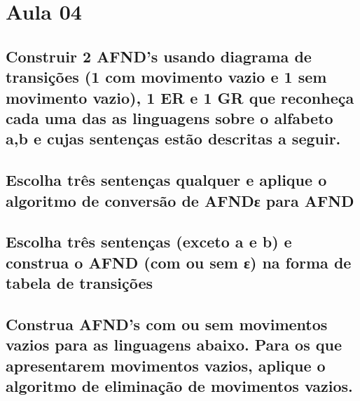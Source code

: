\section{Aula 04}
    \subsection{Construir 2 AFND's usando diagrama de transições (1 com movimento vazio e 1 sem movimento vazio), 1 ER e 1 GR que reconheça cada uma das as linguagens sobre o alfabeto {a,b} e cujas sentenças estão descritas a seguir.}

    \subsection{Escolha três sentenças qualquer e aplique o algoritmo de conversão de AFNDε para AFND}
    
    \subsection{Escolha três sentenças (exceto a e b) e construa o AFND (com ou sem ε) na forma de tabela de transições}

    \subsection{Construa AFND's com ou sem movimentos vazios para as linguagens abaixo. Para os que apresentarem movimentos vazios, aplique o algoritmo de eliminação de movimentos vazios.}
